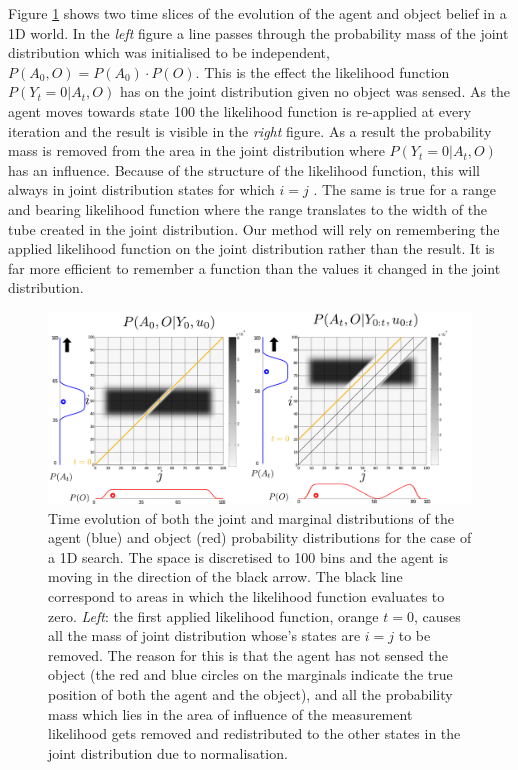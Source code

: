 Figure \ref{fig:margina_joint_example} shows two time slices of the evolution of the agent and object belief in a 1D world. In the \textit{left}
figure a line passes through the probability mass of the joint distribution which was initialised to be independent,
$P(A_0,O) = P(A_0) \cdot P(O)$. This is the effect the likelihood function $P(Y_t=0|A_t,O)$ has on the joint distribution given no object was sensed. As the agent 
moves towards state 100 the likelihood function is re-applied at every iteration and the result is visible in the \textit{right} figure. 
As a result the probability mass is removed from the area in the joint distribution where $P(Y_t=0|A_t,O)$ has an influence.
Because of the structure of the likelihood function, this will always in joint distribution states for which $i=j$ . 
The same is true for a range and bearing likelihood function where the range translates to the width of the tube created in the 
joint distribution. Our method will rely on remembering the applied likelihood function on the joint distribution rather than the result. 
It is far more efficient to remember a function than the values it changed in the
joint distribution.

\begin{figure}
 \centering
 \includegraphics[width=\textwidth]{./ch5-MLMF/Figures/Figure6.pdf}
 \caption{Time evolution of both the joint and marginal distributions of the agent (blue) and object (red) probability distributions for 
 the case of a 1D search. The space is discretised to 100 bins and the agent is moving in the direction of the black arrow. 
 The black line correspond to areas in which the likelihood function evaluates to zero.  \textit{Left}: the first applied 
 likelihood function, orange $t=0$, causes all the mass of joint distribution whose's states are $i=j$ to be removed. 
 The reason for this is that the agent has not sensed the object (the red and blue circles on the marginals indicate the true position of
 both the agent and the object), and all the probability mass which lies in the area of influence of the measurement likelihood gets 
 removed and redistributed to the other states in the joint distribution due to normalisation.}
 \label{fig:margina_joint_example}
\end{figure}

